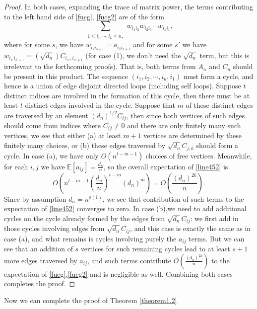 \documentclass[12pt, reqno]{amsart}
\theoremstyle{definition}
\theoremstyle{remark}
\numberwithin{equation}{section}
\begin{document}
\begin{proof}
    In both cases, expanding the trace of matrix power, the terms contributing to the left hand side of \eqref{fucg}, \eqref{fucg2} are of the form
    \begin{equation}\label{line452}
\sum_{\substack{1\leq i_1,\cdots,i_k\leq n,}} w_{i_1i_2}w_{i_2i_3}\cdots w_{i_ki_1},
    \end{equation}
where for some $s$, we have $w_{i_si_{s+1}}=a_{i_si_{s+1}}$ and for some $s'$ we have $w_{i_{s'}i_{s'+1}}=(\sqrt{d_n})C_{i_{s'},i_{s'+1}}$ (for case (1), we don't need the $\sqrt{d_n}$ term, but this is irrelevant to the forthcoming proofs). That is, both terms from $A_n$ and $C_n$ should be present in this product. The sequence $(i_1,i_2,\cdots,i_k,i_1)$ must form a cycle, and hence is a union of edge disjoint directed loops (including self loops). Suppose $t$ distinct indices are involved in the formation of this cycle, then there must be at least $t$ distinct edges involved in the cycle. Suppose that $m$ of these distinct edges are traversed by an element $(d_n)^{1/2}C_{ij}$, then since both vertices of such edges should come from indices where $C_{ij}\neq 0$ and there are only finitely many such vertices, we see that either (a) at least $m+1$ vertices are determined by these finitely many choices, or (b) these  edges traversed by $\sqrt{d_n}C_{j,k}$ should form a cycle. In case (a), we have only $O(n^{t-m-1})$ choices of free vertices. Meanwhile, for each $i,j$ we have $\mathbb{E}[a_{ij}]=\frac{d_n}{n}$, so the overall expectation of \eqref{line452} is $$O\left(n^{t-m-1}(\frac{d_n}{n})^{t-m}(d_n)^{m}\right)=O\left(\frac{(d_n)^{2k}}{n}\right).$$ Since by assumption $d_n=n^{o(1)}$, we see that contribution of such terms to the expectation of \eqref{line452} converges to zero. In case (b),we need to add additional cycles on the cycle already formed by the edges from $\sqrt{d_n}
C_{ij}$: we first add in those cycles involving edges from $\sqrt{d_n}C_{ij}$, and this case is exactly the same as in case (a), and what remains is cycles involving purely the $a_{ij}$ terms.   But we can see that an addition of $s$ vertices for such remaining cycles lead to at least $s+1$ more edges traversed by $a_{ij}$, and such terms contribute $O(\frac{(d_n)^{2k}}{n})$ to the expectation of \eqref{fucg},\eqref{fucg2} and is negligible as well. Combining both cases completes the proof.

\end{proof}


Now we can complete the proof of Theorem \ref{theorem1.2}.
\end{document}
